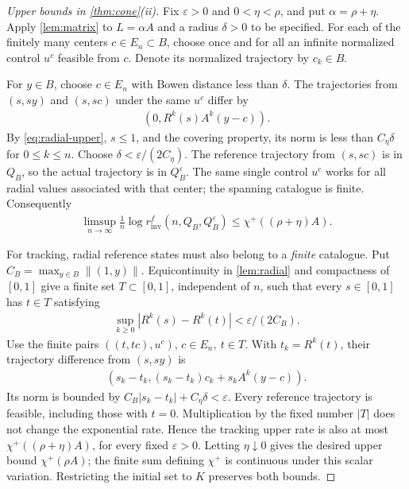 \documentclass[11pt,a4paper]{article}
\theoremstyle{definition}
\theoremstyle{remark}
\begin{document}
\begin{proof}[Upper bounds in \cref{thm:cone}(ii)]
Fix \(\varepsilon>0\) and \(0<\eta<\rho\), and put \(\alpha=\rho+\eta\). Apply \cref{lem:matrix} to \(L=\alpha A\) and a radius \(\delta>0\) to be specified. For each of the finitely many centers \(c\in E_n\subset B\), choose once and for all an infinite normalized control \(u^c\) feasible from \(c\). Denote its normalized trajectory by \(c_k\in B\).

For \(y\in B\), choose \(c\in E_n\) with Bowen distance less than \(\delta\). The trajectories from \((s,sy)\) and \((s,sc)\) under the same \(u^c\) differ by
\begin{align*}
 (0,R^k(s)A^k(y-c)).
\end{align*}
By \eqref{eq:radial-upper}, \(s\leq1\), and the covering property, its norm is less than \(C_\eta\delta\) for \(0\leq k\leq n\). Choose \(\delta<\varepsilon/(2C_\eta)\). The reference trajectory from \((s,sc)\) is in \(Q_B\), so the actual trajectory is in \(Q_B^\varepsilon\). The same single control \(u^c\) works for all radial values associated with that center; the spanning catalogue is finite. Consequently
\begin{align*}
 \limsup_{n\to\infty}\frac1n
 \log r_{\mathrm{inv}}^{f}(n,Q_B,Q_B^\varepsilon)
 \leq\chi^+((\rho+\eta)A).
\end{align*}

For tracking, radial reference states must also belong to a \emph{finite} catalogue. Put \(C_B=\max_{y\in B}\left\lVert (1,y)\right\rVert\). Equicontinuity in \cref{lem:radial} and compactness of \([0,1]\) give a finite set \(T\subset[0,1]\), independent of \(n\), such that every \(s\in[0,1]\) has \(t\in T\) satisfying
\begin{align*}
 \sup_{k\geq0}|R^k(s)-R^k(t)|<\varepsilon/(2C_B).
\end{align*}
Use the finite pairs \(((t,tc),u^c)\), \(c\in E_n,\ t\in T\).
With \(t_k=R^k(t)\), their trajectory difference from \((s,sy)\) is
\begin{align*}
 (s_k-t_k,(s_k-t_k)c_k+s_kA^k(y-c)).
\end{align*}
Its norm is bounded by
\(C_B|s_k-t_k|+C_\eta\delta<\varepsilon\).
Every reference trajectory is feasible, including those with \(t=0\). Multiplication by the fixed number \(|T|\) does not change the exponential rate. Hence the tracking upper rate is also at most \(\chi^+((\rho+\eta)A)\), for every fixed \(\varepsilon>0\). Letting \(\eta\downarrow0\) gives the desired upper bound \(\chi^+(\rho A)\); the finite sum defining \(\chi^+\) is continuous under this scalar variation. Restricting the initial set to \(K\) preserves both bounds.
\end{proof}
\end{document}
